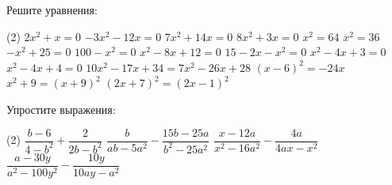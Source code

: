 \begin{class}[number=2]
	\begin{listofex}
		\item Решите уравнения:
		\begin{tasks}(2)
			\task \( 2x^2+x=0 \)
			\task \( -3x^2-12x=0 \)
			\task \( 7x^2+14x=0 \)
			\task \( 8x^2+3x=0 \)
			\task \( x^2=64 \)
			\task \( x^2=36 \)
			\task \( -x^2+25=0 \)
			\task \( 100-x^2=0 \)
			\task \( x^2-8x+12=0 \)
			\task \( 15-2x-x^2=0 \)
			\task \( x^2-4x+3=0 \)
			\task \( x^2-4x+4=0 \)
			\task \( 10x^2-17x+34=7x^2-26x+28 \)
			\task \( (x-6)^2=-24x \)
			\task \( x^2+9=(x+9)^2 \)
			\task \( (2x+7)^2=(2x-1)^2 \)
		\end{tasks}
		\item Упростите выражения:
		\begin{tasks}(2)
			\task \( \dfrac{b-6}{4-b^2}+\dfrac{2}{2b-b^2} \)
			\task \( \dfrac{b}{ab-5a^2}-\dfrac{15b-25a}{b^2-25a^2} \)
			\task \( \dfrac{x-12a}{x^2-16a^2}-\dfrac{4a}{4ax-x^2} \)
			\task \( \dfrac{a-30y}{a^2-100y^2}-\dfrac{10y}{10ay-a^2} \)
		\end{tasks}
	\end{listofex}
\end{class}

\begin{homework}[number=2]
	\begin{listofex}
		\item 
	\end{listofex}
\end{homework}

